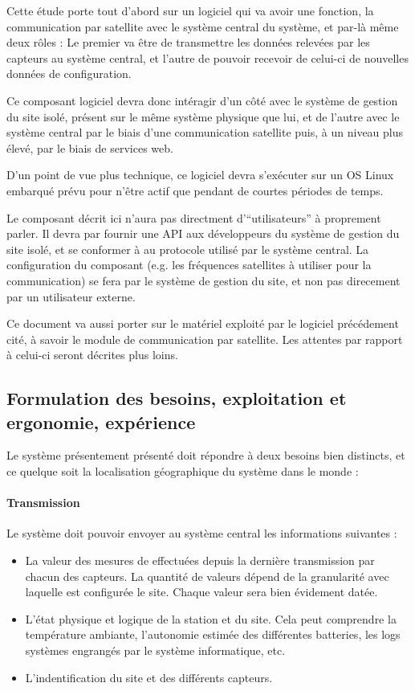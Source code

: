 Cette étude porte tout d'abord sur un logiciel qui va avoir une fonction, la communication par satellite avec le système central du système, et par-là même deux rôles : Le premier va être de transmettre les données relevées par les capteurs au système central, et l'autre de pouvoir recevoir de celui-ci de nouvelles données de configuration.

Ce composant logiciel devra donc intéragir d'un côté avec le système de gestion du site isolé, présent sur le même système physique que lui, et de l'autre avec le système central par le biais d'une communication satellite puis, à un niveau plus élevé, par le biais de services web.

D'un point de vue plus technique, ce logiciel devra s'exécuter sur un OS Linux embarqué prévu pour n'être actif que pendant de courtes périodes de temps.

Le composant décrit ici n'aura pas directment d'``utilisateurs'' à proprement parler. Il devra par fournir une API aux développeurs du système de gestion du site isolé, et se conformer à au protocole utilisé par le système central. La configuration du composant (e.g. les fréquences satellites à utiliser pour la communication) se fera par le système de gestion du site, et non pas direcement par un utilisateur externe.

Ce document va aussi porter sur le matériel exploité par le logiciel précédement cité, à savoir le module de communication par satellite. Les attentes par rapport à celui-ci seront décrites plus loins.

\subsection{Formulation des besoins, exploitation et ergonomie, expérience}

Le système présentement présenté doit répondre à deux besoins bien distincts, et ce quelque soit la localisation géographique du système dans le monde :

\paragraph{Transmission} Le système doit pouvoir envoyer au système central les informations suivantes :

\begin{itemize}
\item La valeur des mesures de effectuées depuis la dernière transmission par chacun des capteurs. La quantité de valeurs dépend de la granularité avec laquelle est configurée le site. Chaque valeur sera bien évidement datée.
\item L'état physique et logique de la station et du site. Cela peut comprendre la température ambiante, l'autonomie estimée des différentes batteries, les logs systèmes engrangés par le système informatique, etc.
\item L'indentification du site et des différents capteurs. %
\end{itemize}

